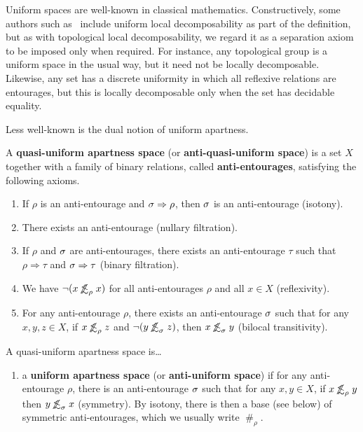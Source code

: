 \documentclass{article}
\def\apart{\mathrel{\#}}
\def\oapt{\mathrel{\!\not\,\not\lesssim}}
\def\aent#1{\oapt_{#1}}
\let\implies\Rightarrow
\def\nn{\ensuremath{\neg\neg}}
\begin{document}
Uniform spaces are well-known in classical mathematics.
Constructively, some authors such as~\cite{bridges-vita} include uniform local decomposability as part of the definition, but as with topological local decomposability, we regard it as a separation axiom to be imposed only when required.
For instance, any topological group is a uniform space in the usual way, but it need not be locally decomposable.
Likewise, any set has a discrete uniformity in which all reflexive relations are entourages, but this is locally decomposable only when the set has decidable equality.

Less well-known is the dual notion of uniform apartness.

\begin{defn}
  A \textbf{quasi-uniform apartness space} (or \textbf{anti-quasi-uniform space}) is a set $X$ together with a family of binary relations, called \textbf{anti-entourages}, satisfying the following axioms.
  \begin{enumerate}
  \item If $\rho$ is an anti-entourage and $\si\implies\rho$, then $\sigma$ is an anti-entourage (isotony).
  \item There exists an anti-entourage (nullary filtration).
  \item If $\rho$ and $\sigma$ are anti-entourages, there exists an anti-entourage $\tau$ such that $\rho\implies\tau$ and $\si\implies\tau$ (binary filtration).
  \item We have $\neg(x\aent\rho x)$ for all anti-entourages $\rho$ and all $x\in X$ (reflexivity).
  \item For any anti-entourage $\rho$, there exists an anti-entourage $\sigma$ such that for any $x,y,z\in X$, if $x\aent\rho z$ and $\neg(y\aent\si z)$, then $x\aent\si y$ (bilocal transitivity).
  \end{enumerate}
  A quasi-uniform apartness space is\dots
  \begin{enumerate}[resume]
  \item a \textbf{uniform apartness space} (or \textbf{anti-uniform space}) if for any anti-entourage $\rho$, there is an anti-entourage $\sigma$ such that for any $x,y\in X$, if $x\aent\rho y$ then $y\aent\si x$ (symmetry).
    By isotony, there is then a base (see below) of symmetric anti-entourages, which we usually write $\apart_\rho$.

\end{enumerate}
\end{defn}
\end{document}

